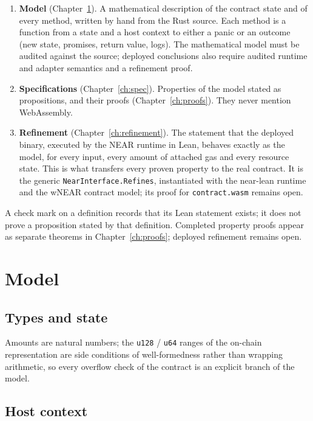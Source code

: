 \begin{enumerate}
\item \textbf{Model} (Chapter~\ref{ch:model}). A mathematical description of
  the contract state and of every method, written by hand from the Rust
  source. Each method is a function from a state and a host context to either
  a panic or an outcome (new state, promises, return value, logs). The
  mathematical model must be audited against the source; deployed conclusions
  also require audited runtime and adapter semantics and a refinement proof.
\item \textbf{Specifications} (Chapter~\ref{ch:spec}). Properties of the
  model stated as propositions, and their proofs (Chapter~\ref{ch:proofs}).
  They never mention WebAssembly.
\item \textbf{Refinement} (Chapter~\ref{ch:refinement}). The statement that
  the deployed binary, executed by the NEAR runtime in Lean, behaves exactly
  as the model, for every input, every amount of attached gas and every
  resource state. This is what transfers every proven property to the real
  contract. It is the generic \texttt{NearInterface.Refines}, instantiated
  with the near-lean runtime and the wNEAR contract model; its proof for
  \texttt{contract.wasm} remains open.
\end{enumerate}

A check mark on a definition records that its Lean statement exists; it does
not prove a proposition stated by that definition. Completed property proofs
appear as separate theorems in Chapter~\ref{ch:proofs}; deployed refinement
remains open.

\chapter{Model}
\label{ch:model}

\section{Types and state}

Amounts are natural numbers; the \texttt{u128} / \texttt{u64} ranges of the
on-chain representation are side conditions of well-formedness rather than
wrapping arithmetic, so every overflow check of the contract is an explicit
branch of the model.


\section{Host context}

